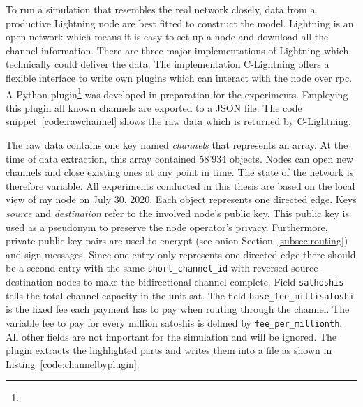 \documentclass[final]{fhnwreport}       %
\begin{document}
To run a simulation that resembles the real network closely, data from a productive Lightning node are best fitted to construct the model. Lightning is an open network which means it is easy to set up a node and download all the channel information. There are three major implementations of Lightning which technically could deliver the data. The implementation \mbox{C-Lightning} offers a flexible interface to write own plugins which can interact with the node over \gls{rpc}. A Python plugin\footnote{\gitpluginurl} was developed in preparation for the experiments. Employing this plugin all known channels are exported to a JSON file. The code snippet~\ref{code:rawchannel} shows the raw data which is returned by C-Lightning. 


The raw data contains one key named \emph{channels} that represents an array. At the time of data extraction, this array contained 58'934 objects. Nodes can open new channels and close existing ones at any point in time. The state of the network is therefore variable. All experiments conducted in this thesis are based on the local view of my node on July 30, 2020. Each object represents one directed edge. Keys \emph{source} and \emph{destination} refer to the involved node's public key. This public key is used as a pseudonym to preserve the node operator's privacy. Furthermore, private-public key pairs are used to encrypt (see onion Section~\ref{subsec:routing}) and sign messages. Since one entry only represents one directed edge there should be a second entry with the same \texttt{short\_channel\_id} with reversed source-destination nodes to make the bidirectional channel complete. Field \texttt{sathoshis} tells the total channel capacity in the unit sat. The field \texttt{base\_fee\_millisatoshi} is the fixed fee each payment has to pay when routing through the channel. The variable fee to pay for every million satoshis is defined by \texttt{fee\_per\_millionth}. All other fields are not important for the simulation and will be ignored. The plugin extracts the highlighted parts and writes them into a file as shown in Listing~\ref{code:channelbyplugin}. 
\end{document}
